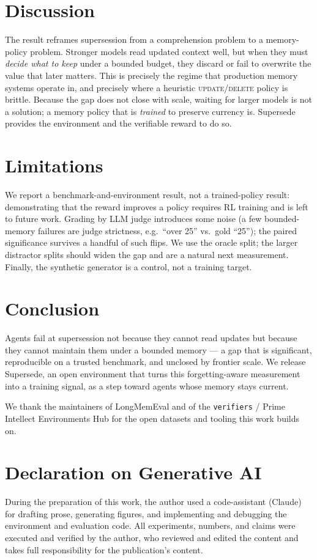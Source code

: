 \documentclass[]{ceurart}
\begin{document}
\section{Discussion}

The result reframes supersession from a comprehension problem to a memory-policy
problem. Stronger models read updated context well, but when they must
\emph{decide what to keep} under a bounded budget, they discard or fail to
overwrite the value that later matters. This is precisely the regime that
production memory systems operate in, and precisely where a heuristic
\textsc{update}/\textsc{delete} policy \cite{chhikara2025mem0} is brittle.
Because the gap does not close with scale, waiting for larger models is not a
solution; a memory policy that is \emph{trained} to preserve currency is.
Supersede provides the environment and the verifiable reward to do so.

\section{Limitations}

We report a benchmark-and-environment result, not a trained-policy result:
demonstrating that the reward improves a policy requires RL training and is
left to future work. Grading by LLM judge introduces some noise (a few
bounded-memory failures are judge strictness, e.g.\ ``over 25'' vs.\ gold
``25''); the paired significance survives a handful of such flips. We use the
oracle split; the larger distractor splits should widen the gap and are a
natural next measurement. Finally, the synthetic generator is a control, not a
training target.

\section{Conclusion}

Agents fail at supersession not because they cannot read updates but because
they cannot maintain them under a bounded memory --- a gap that is significant,
reproducible on a trusted benchmark, and unclosed by frontier scale. We release
Supersede, an open environment that turns this forgetting-aware measurement
into a training signal, as a step toward agents whose memory stays current.

\begin{acknowledgments}
  We thank the maintainers of LongMemEval and of the \texttt{verifiers} /
  Prime Intellect Environments Hub for the open datasets and tooling this work
  builds on.
\end{acknowledgments}

\section*{Declaration on Generative AI}
  During the preparation of this work, the author used a code-assistant
  (Claude) for drafting prose, generating figures, and implementing and
  debugging the environment and evaluation code. All experiments, numbers, and
  claims were executed and verified by the author, who reviewed and edited the
  content and takes full responsibility for the publication's content.


\end{document}

